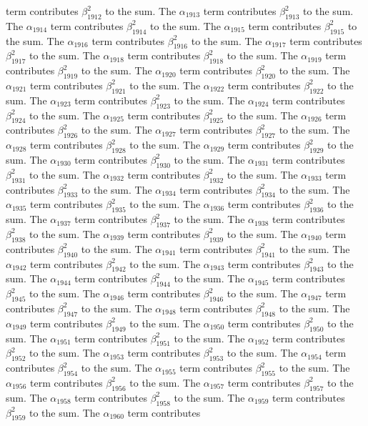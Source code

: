 \begin{lemma}
term contributes $\beta_{1912}^{2}$ to the sum. The $\alpha_{1913}$ term contributes $\beta_{1913}^{2}$ to the sum. The $\alpha_{1914}$ term contributes $\beta_{1914}^{2}$ to the sum. The $\alpha_{1915}$ term contributes $\beta_{1915}^{2}$ to the sum. The $\alpha_{1916}$ term contributes $\beta_{1916}^{2}$ to the sum. The $\alpha_{1917}$ term contributes $\beta_{1917}^{2}$ to the sum. The $\alpha_{1918}$ term contributes $\beta_{1918}^{2}$ to the sum. The $\alpha_{1919}$ term contributes $\beta_{1919}^{2}$ to the sum. The $\alpha_{1920}$ term contributes $\beta_{1920}^{2}$ to the sum. The $\alpha_{1921}$ term contributes $\beta_{1921}^{2}$ to the sum. The $\alpha_{1922}$ term contributes $\beta_{1922}^{2}$ to the sum. The $\alpha_{1923}$ term contributes $\beta_{1923}^{2}$ to the sum. The $\alpha_{1924}$ term contributes $\beta_{1924}^{2}$ to the sum. The $\alpha_{1925}$ term contributes $\beta_{1925}^{2}$ to the sum. The $\alpha_{1926}$ term contributes $\beta_{1926}^{2}$ to the sum. The $\alpha_{1927}$ term contributes $\beta_{1927}^{2}$ to the sum. The $\alpha_{1928}$ term contributes $\beta_{1928}^{2}$ to the sum. The $\alpha_{1929}$ term contributes $\beta_{1929}^{2}$ to the sum. The $\alpha_{1930}$ term contributes $\beta_{1930}^{2}$ to the sum. The $\alpha_{1931}$ term contributes $\beta_{1931}^{2}$ to the sum. The $\alpha_{1932}$ term contributes $\beta_{1932}^{2}$ to the sum. The $\alpha_{1933}$ term contributes $\beta_{1933}^{2}$ to the sum. The $\alpha_{1934}$ term contributes $\beta_{1934}^{2}$ to the sum. The $\alpha_{1935}$ term contributes $\beta_{1935}^{2}$ to the sum. The $\alpha_{1936}$ term contributes $\beta_{1936}^{2}$ to the sum. The $\alpha_{1937}$ term contributes $\beta_{1937}^{2}$ to the sum. The $\alpha_{1938}$ term contributes $\beta_{1938}^{2}$ to the sum. The $\alpha_{1939}$ term contributes $\beta_{1939}^{2}$ to the sum. The $\alpha_{1940}$ term contributes $\beta_{1940}^{2}$ to the sum. The $\alpha_{1941}$ term contributes $\beta_{1941}^{2}$ to the sum. The $\alpha_{1942}$ term contributes $\beta_{1942}^{2}$ to the sum. The $\alpha_{1943}$ term contributes $\beta_{1943}^{2}$ to the sum. The $\alpha_{1944}$ term contributes $\beta_{1944}^{2}$ to the sum. The $\alpha_{1945}$ term contributes $\beta_{1945}^{2}$ to the sum. The $\alpha_{1946}$ term contributes $\beta_{1946}^{2}$ to the sum. The $\alpha_{1947}$ term contributes $\beta_{1947}^{2}$ to the sum. The $\alpha_{1948}$ term contributes $\beta_{1948}^{2}$ to the sum. The $\alpha_{1949}$ term contributes $\beta_{1949}^{2}$ to the sum. The $\alpha_{1950}$ term contributes $\beta_{1950}^{2}$ to the sum. The $\alpha_{1951}$ term contributes $\beta_{1951}^{2}$ to the sum. The $\alpha_{1952}$ term contributes $\beta_{1952}^{2}$ to the sum. The $\alpha_{1953}$ term contributes $\beta_{1953}^{2}$ to the sum. The $\alpha_{1954}$ term contributes $\beta_{1954}^{2}$ to the sum. The $\alpha_{1955}$ term contributes $\beta_{1955}^{2}$ to the sum. The $\alpha_{1956}$ term contributes $\beta_{1956}^{2}$ to the sum. The $\alpha_{1957}$ term contributes $\beta_{1957}^{2}$ to the sum. The $\alpha_{1958}$ term contributes $\beta_{1958}^{2}$ to the sum. The $\alpha_{1959}$ term contributes $\beta_{1959}^{2}$ to the sum. The $\alpha_{1960}$ term contributes 
\end{lemma}
